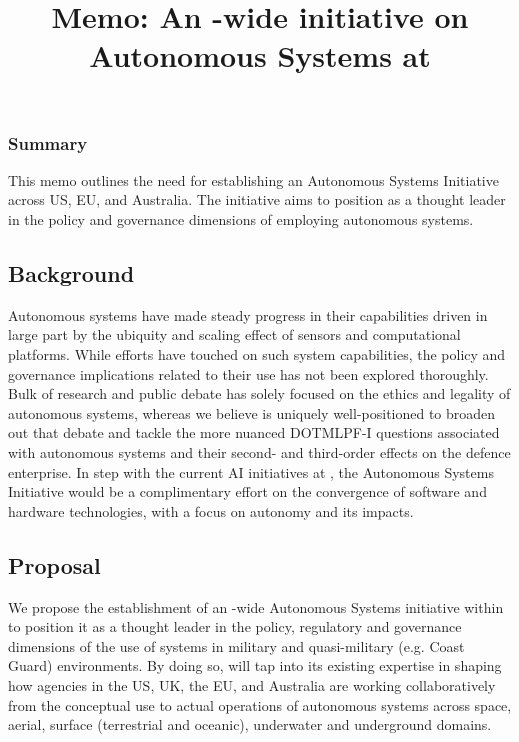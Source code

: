 \documentclass[11pt,letterpaper]{article}
\title{Memo: An \auke-wide initiative on Autonomous Systems at \org}
\begin{document}
\maketitle{}

\subsubsection{Summary}

This memo outlines the need for establishing an Autonomous Systems Initiative across \org US, EU, and Australia. The initiative aims to position \org as a thought leader in the policy and governance dimensions of employing autonomous systems.

\subsection{Background}

Autonomous systems have made steady progress in their capabilities driven in large part by the ubiquity and scaling effect of sensors and computational platforms. While \org efforts have touched on such system capabilities, the policy and governance implications related to their use has not been explored thoroughly. Bulk of research and public debate has solely focused on the ethics and legality of autonomous systems, whereas we believe \org is uniquely well-positioned to broaden out that debate and tackle the more nuanced DOTMLPF-I questions associated with autonomous systems and their second- and third-order effects on the defence enterprise. In step with the current AI initiatives at \org, the Autonomous Systems Initiative would be a complimentary effort on the convergence of software and hardware technologies, with a focus on autonomy and its impacts. 


\subsection{Proposal}

We propose the establishment of an \auke-wide Autonomous  Systems initiative within \org to position it as a thought leader in the policy, regulatory and governance dimensions of the use of  systems in military and quasi-military (e.g. Coast Guard) environments. By doing so, \org will tap into its existing expertise in shaping how agencies in the US, UK, the EU, and Australia are working collaboratively from the conceptual use to actual operations of autonomous systems across space, aerial, surface (terrestrial and oceanic), underwater and underground domains.
\end{document}

